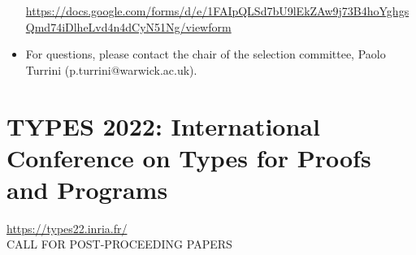 \documentclass[prodmode,acmtecs]{acmsmall} %
\begin{document}
\begin{itemize}
  \href{https://docs.google.com/forms/d/e/1FAIpQLSd7bU9lEkZAw9j73B4hoYghgsQmd74iDlheLvd4n4dCyN51Ng/viewform}{https://docs.google.com/forms/d/e/1FAIpQLSd7bU9lEkZAw9j73B4hoYghgsQmd74iDlheLvd4n4dCyN51Ng/viewform} 
 
\item  For questions, please contact the chair of the selection committee, Paolo Turrini (p.turrini@warwick.ac.uk). 
 
\end{itemize}\section{TYPES 2022: International Conference on Types for Proofs and Programs}\label{TYPES2022}  \href{https://types22.inria.fr/}{https://types22.inria.fr/}\\ 
CALL FOR POST-PROCEEDING PAPERS 
\end{document}
